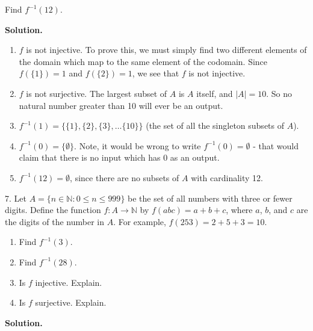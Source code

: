 \documentclass[10pt,]{book}
\theoremstyle{plain}
\theoremstyle{definition}
\theoremstyle{definition}
\theoremstyle{definition}
\numberwithin{equation}{section}
\def\N{\mathbb N}
\def\inv{^{-1}}
\def\st{:}
\begin{document}
\begin{exerciselist}
\begin{enumerate}[label=(\alph*)]
                Find \(f\inv(12)\).
\end{enumerate}
\par\smallskip
\par\smallskip
\noindent\textbf{Solution.}\hypertarget{solution-50}{}\quad
\leavevmode%
\begin{enumerate}[label=(\alph*)]
\item\hypertarget{li-326}{}\(f\) is not injective. To prove this, we must simply find two different elements of the domain which map to the same element of the codomain. Since \(f(\{1\}) = 1\) and \(f(\{2\}) = 1\), we see that \(f\) is not injective.%
\item\hypertarget{li-327}{}\(f\) is not surjective. The largest subset of \(A\) is \(A\) itself, and \(|A| = 10\). So no natural number greater than 10 will ever be an output.%
\item\hypertarget{li-328}{}\(f\inv(1) = \{\{1\}, \{2\}, \{3\}, \ldots \{10\}\}\) (the set of all the singleton subsets of \(A\)).%
\item\hypertarget{li-329}{}\(f\inv(0) = \{\emptyset\}\). Note, it would be wrong to write \(f\inv(0) = \emptyset\) - that would claim that there is no input which has 0 as an output.%
\item\hypertarget{li-330}{}\(f\inv(12) = \emptyset\), since there are no subsets of \(A\) with cardinality 12.%
\end{enumerate}
\item[7.]\hypertarget{exercise-33}{}
            Let \(A = \{n \in \N \st 0 \le n \le 999\}\) be the set of all numbers with three or fewer digits. Define the function \(f:A \to \N\) by \(f(abc) = a+b+c\), where \(a\), \(b\), and \(c\) are the digits of the number in \(A\). For example, \(f(253) = 2 + 5 + 3 =  10\).
\leavevmode%
\begin{enumerate}[label=(\alph*)]
\item\hypertarget{li-331}{}
                Find \(f\inv(3)\).
\item\hypertarget{li-332}{}
                Find \(f\inv(28)\).
\item\hypertarget{li-333}{}
                Is \(f\) injective. Explain.
\item\hypertarget{li-334}{}
                Is \(f\) surjective. Explain.
\end{enumerate}
\par\smallskip
\par\smallskip
\noindent\textbf{Solution.}\hypertarget{solution-51}{}\quad

\end{exerciselist}
\end{document}
